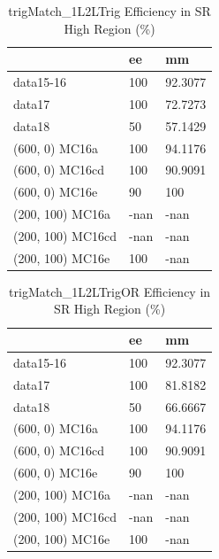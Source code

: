 \begin{table}
\begin{center}
\caption{trigMatch\_1L2LTrig Efficiency in SR High Region (\%)}
\begin{tabular}{l|l|l}
& ee & mm \\
\hline
data15-16 & 100 & 92.3077 \\
data17 & 100 & 72.7273 \\
data18 & 50 & 57.1429 \\
(600, 0) MC16a & 100 & 94.1176 \\
(600, 0) MC16cd & 100 & 90.9091 \\
(600, 0) MC16e & 90 & 100 \\
(200, 100) MC16a & -nan & -nan \\
(200, 100) MC16cd & -nan & -nan \\
(200, 100) MC16e & 100 & -nan \\
\end{tabular}
\end{center}
\end{table}

\begin{table}
\begin{center}
\caption{trigMatch\_1L2LTrigOR Efficiency in SR High Region (\%)}
\begin{tabular}{l|l|l}
& ee & mm \\
\hline
data15-16 & 100 & 92.3077 \\
data17 & 100 & 81.8182 \\
data18 & 50 & 66.6667 \\
(600, 0) MC16a & 100 & 94.1176 \\
(600, 0) MC16cd & 100 & 90.9091 \\
(600, 0) MC16e & 90 & 100 \\
(200, 100) MC16a & -nan & -nan \\
(200, 100) MC16cd & -nan & -nan \\
(200, 100) MC16e & 100 & -nan \\
\end{tabular}
\end{center}
\end{table}

